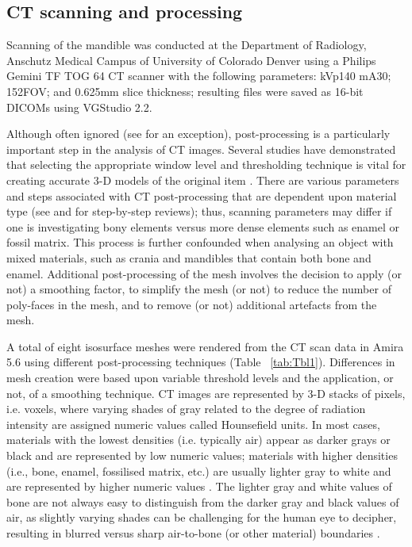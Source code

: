 \documentclass[review]{elsarticle}
\begin{document}
\subsection{CT scanning and processing}

Scanning of the mandible was conducted at the Department of Radiology, Anschutz Medical Campus of University of Colorado Denver using a Philips Gemini TF TOG 64 CT scanner with the following parameters: kVp140 mA30; 152FOV; and 0.625mm slice thickness; resulting files were saved as 16-bit DICOMs using VGStudio 2.2. 

Although often ignored (see \citealt{RN8984} for an exception), post-processing is a particularly important step in the analysis of CT images. Several studies have demonstrated that selecting the appropriate window level and thresholding technique is vital for creating accurate 3-D models of the original item \citep{RN11483,RN11485,RN11486}. There are various parameters and steps associated with CT post-processing that are dependent upon material type (see \citealt{RN11484} and \citealt{RN11478} for step-by-step reviews); thus, scanning parameters may differ if one is investigating bony elements versus more dense elements such as enamel or fossil matrix. This process is further confounded when analysing an object with mixed materials, such as crania and mandibles that contain both bone and enamel. Additional post-processing of the mesh involves the decision to apply (or not) a smoothing factor, to simplify the mesh (or not) to reduce the number of poly-faces in the mesh, and to remove (or not) additional artefacts from the mesh. 

A total of eight isosurface meshes were rendered from the CT scan data in Amira 5.6 \citep{RN5898} using different post-processing techniques (Table ~\ref{tab:Tbl1}). Differences in mesh creation were based upon variable threshold levels and the application, or not, of a smoothing technique. CT images are represented by 3-D stacks of pixels, i.e. voxels, where varying shades of gray related to the degree of radiation intensity are assigned numeric values called Hounsefield units. In most cases, materials with the lowest densities (i.e. typically air) appear as darker grays or black and are represented by low numeric values; materials with higher densities (i.e., bone, enamel, fossilised matrix, etc.) are usually lighter gray to white and are represented by higher numeric values \citep{RN11484,RN11482}. The lighter gray and white values of bone are not always easy to distinguish from the darker gray and black values of air, as slightly varying shades can be challenging for the human eye to decipher, resulting in blurred versus sharp air-to-bone (or other material) boundaries \citep{RN11478}. 
\end{document}
